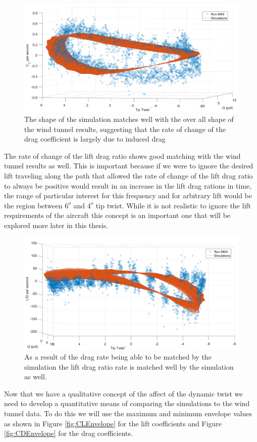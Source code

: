 \documentclass[11pt]{ucthesis}
\begin{document}
\begin{figure}[thpb]
\centering
\includegraphics[width=.75\linewidth]{Figures/diffCD5454.png}
\caption{The shape of the simulation matches well with the over all shape of the wind tunnel results, suggesting that the rate of change of the drag coefficient is largely due to induced drag}
\label{fig:dCDdtRun5454}
\end{figure}

The rate of change of the lift drag ratio shows good matching with the wind tunnel results as well. This is important because if we were to ignore the desired lift traveling along the path that allowed the rate of change of the lift drag ratio to always be positive would result in an increase in the lift drag rations in time, the range of particular interest for this frequency and for arbitrary lift would be the region between $6^o$ and $4^o$ tip twist. While it is not realistic to ignore the lift requirements of the aircraft this concept is an important one that will be explored more later in this thesis.

\begin{figure}[thpb]
\centering
\includegraphics[width=.75\linewidth]{Figures/diffLD5454.png}
\caption{As a result of the drag rate being able to be matched by the simulation the lift drag ratio rate is matched well by the simulation as well.}
\label{fig:dLDdtRun5454}
\end{figure}

Now that we have a qualitative concept of the affect of the dynamic twist we need to develop a quantitative means of comparing the simulations to the wind tunnel data. To do this we will use the maximum and minimum envelope values as shown in Figure \ref{fig:CLEnvelope} for the lift coefficients and Figure \ref{fig:CDEnvelope} for the drag coefficients. 
\end{document}
